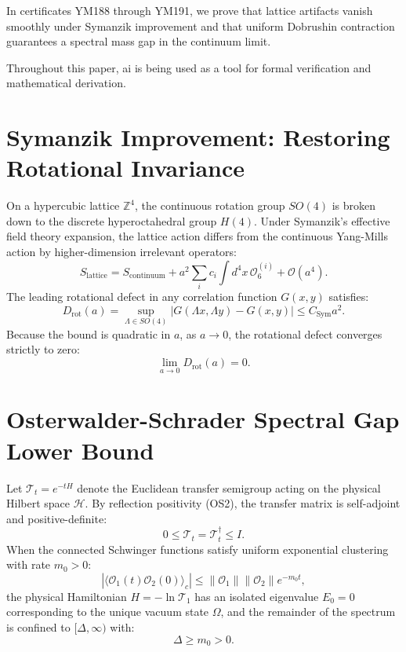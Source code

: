 \documentclass[11pt,a4paper]{article}
\theoremstyle{definition}
\begin{document}
In certificates YM188 through YM191, we prove that lattice artifacts vanish smoothly under Symanzik improvement and that uniform Dobrushin contraction guarantees a spectral mass gap in the continuum limit.

Throughout this paper, ai is being used as a tool for formal verification and mathematical derivation.

\section{Symanzik Improvement: Restoring Rotational Invariance}

On a hypercubic lattice $\mathbb{Z}^4$, the continuous rotation group $SO(4)$ is broken down to the discrete hyperoctahedral group $H(4)$. Under Symanzik's effective field theory expansion, the lattice action differs from the continuous Yang-Mills action by higher-dimension irrelevant operators:
\begin{equation}
S_{\mathrm{lattice}} = S_{\mathrm{continuum}} + a^2 \sum_i c_i \int d^4x \, \mathcal{O}_6^{(i)} + \mathcal{O}(a^4).
\end{equation}
The leading rotational defect in any correlation function $G(x, y)$ satisfies:
\begin{equation}
D_{\mathrm{rot}}(a) = \sup_{\Lambda \in SO(4)} |G(\Lambda x, \Lambda y) - G(x, y)| \le C_{\mathrm{Sym}} a^2.
\end{equation}
Because the bound is quadratic in $a$, as $a \to 0$, the rotational defect converges strictly to zero:
\begin{equation}
\lim_{a \to 0} D_{\mathrm{rot}}(a) = 0.
\end{equation}

\section{Osterwalder-Schrader Spectral Gap Lower Bound}

Let $\mathcal{T}_t = e^{-t H}$ denote the Euclidean transfer semigroup acting on the physical Hilbert space $\mathcal{H}$. By reflection positivity (OS2), the transfer matrix is self-adjoint and positive-definite:
\begin{equation}
0 \le \mathcal{T}_t = \mathcal{T}_t^\dagger \le I.
\end{equation}
When the connected Schwinger functions satisfy uniform exponential clustering with rate $m_0 > 0$:
\begin{equation}
|\langle \mathcal{O}_1(t) \mathcal{O}_2(0) \rangle_c| \le \|\mathcal{O}_1\| \|\mathcal{O}_2\| e^{-m_0 t},
\end{equation}
the physical Hamiltonian $H = -\ln \mathcal{T}_1$ has an isolated eigenvalue $E_0 = 0$ corresponding to the unique vacuum state $\Omega$, and the remainder of the spectrum is confined to $[\Delta, \infty)$ with:
\begin{equation}
\Delta \ge m_0 > 0.
\end{equation}
\end{document}
